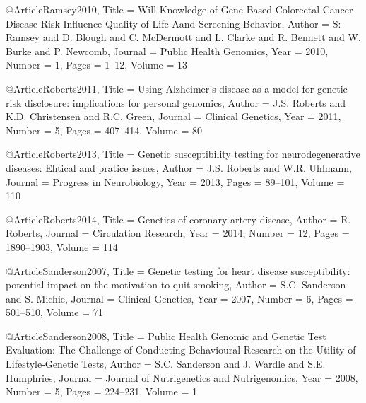 @Article{Ramsey2010,
  Title                    = {Will Knowledge of Gene-Based Colorectal Cancer Disease Risk Influence Quality of Life Aand Screening Behavior},
  Author                   = {S: Ramsey and D. Blough and C. McDermott and L. Clarke and R. Bennett and W. Burke and P. Newcomb},
  Journal                  = {Public Health Genomics},
  Year                     = {2010},
  Number                   = {1},
  Pages                    = {1--12},
  Volume                   = {13}
}

@Article{Roberts2011,
  Title                    = {Using Alzheimer's disease as a model for genetic risk disclosure: implications for personal genomics},
  Author                   = {J.S. Roberts and K.D. Christensen and R.C. Green},
  Journal                  = {Clinical Genetics},
  Year                     = {2011},
  Number                   = {5},
  Pages                    = {407--414},
  Volume                   = {80}
}

@Article{Roberts2013,
  Title                    = {Genetic susceptibility testing for neurodegenerative diseases: Ehtical and pratice issues},
  Author                   = {J.S. Roberts and W.R. Uhlmann},
  Journal                  = {Progress in Neurobiology},
  Year                     = {2013},
  Pages                    = {89--101},
  Volume                   = {110}
}

@Article{Roberts2014,
  Title                    = {Genetics of coronary artery disease},
  Author                   = {R. Roberts},
  Journal                  = {Circulation Research},
  Year                     = {2014},
  Number                   = {12},
  Pages                    = {1890--1903},
  Volume                   = {114}
}

@Article{Sanderson2007,
  Title                    = {Genetic testing for heart disease susceptibility: potential impact on the motivation to quit smoking},
  Author                   = {S.C. Sanderson and S. Michie},
  Journal                  = {Clinical Genetics},
  Year                     = {2007},
  Number                   = {6},
  Pages                    = {501--510},
  Volume                   = {71}
}

@Article{Sanderson2008,
  Title                    = {Public Health Genomic and Genetic Test Evaluation: The Challenge of Conducting Behavioural Research on the Utility of Lifestyle-Genetic Tests},
  Author                   = {S.C. Sanderson and J. Wardle and S.E. Humphries},
  Journal                  = {Journal of Nutrigenetics and Nutrigenomics},
  Year                     = {2008},
  Number                   = {5},
  Pages                    = {224--231},
  Volume                   = {1}
}

